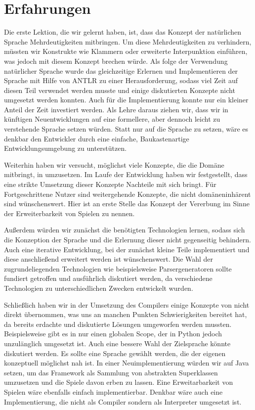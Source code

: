 
\chapter{Erfahrungen}
\label{cha:erfahrungen}

Die erste Lektion, die wir gelernt haben, ist, dass das Konzept der natürlichen Sprache Mehrdeutigkeiten mitbringen. Um diese Mehrdeutigkeiten zu verhindern, müssten wir Konstrukte wie Klammern oder erweiterte Interpunktion einführen, was jedoch mit diesem Konzept brechen würde. Als folge der Verwendung natürlicher Sprache wurde das gleichzeitige Erlernen und Implementieren der Sprache mit Hilfe von ANTLR zu einer Herausforderung, sodass viel Zeit auf diesen Teil verwendet werden musste und einige diskutierten Konzepte nicht umgesetzt werden konnten. Auch für die Implementierung konnte nur ein kleiner Anteil der Zeit investiert werden. Als Lehre daraus ziehen wir, dass wir in künftigen Neuentwicklungen auf eine formellere, aber dennoch leicht zu verstehende Sprache setzen würden. Statt nur auf die Sprache zu setzen, wäre es denkbar den Entwickler durch eine einfache, Baukastenartige Entwicklungsumgebung zu unterstützen.

Weiterhin haben wir versucht, möglichst viele Konzepte, die die Domäne mitbringt, in \dg umzusetzen. Im Laufe der Entwicklung haben wir festgestellt, dass eine strikte Umsetzung dieser Konzepte Nachteile mit sich bringt. Für Fortgeschrittene Nutzer sind weitergehende Konzepte, die nicht domäneninhärent sind wünschenswert. Hier ist an erste Stelle das Konzept der Vererbung im Sinne der Erweiterbarkeit von Spielen zu nennen.


Außerdem würden wir zunächst die benötigten Technologien lernen, sodass sich die Konzeption der Sprache und die Erlernung dieser nicht gegenseitig behindern. Auch eine iterative Entwicklung, bei der zunächst kleine Teile implementiert und diese anschließend erweitert werden ist wünschenswert. Die Wahl der zugrundeliegenden Technologien wie beispielsweise Parsergeneratoren sollte fundiert getroffen und ausführlich diskutiert werden, da verschiedene Technologien zu unterschiedlichen Zwecken entwickelt wurden.

Schließlich haben wir in der Umsetzung des Compilers einige Konzepte von \dg nicht direkt übernommen, was uns an manchen Punkten Schwierigkeiten bereitet hat, da bereits erdachte und diskutierte Lösungen umgeworfen werden mussten. Beispielsweise gibt es in \dg nur einen globalen Scope, der in Python jedoch unzulänglich umgesetzt ist. Auch eine bessere Wahl der Zielsprache könnte diskutiert werden. Es sollte eine Sprache gewählt werden, die der eigenen konzeptuell möglichst nah ist. In einer Neuimplementierung würden wir auf Java setzen, um das Framework als Sammlung von abstrakten Superklassen umzusetzen und die Spiele davon erben zu lassen. Eine Erweitarbarkeit von Spielen wäre ebenfalls einfach implementierbar. Denkbar wäre auch eine Implementierung, die nicht als Compiler sondern als Interpreter umgesetzt ist.